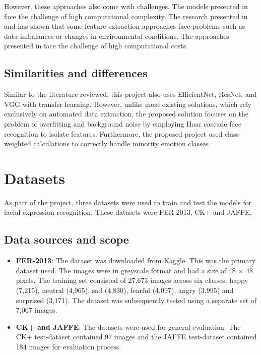 However, these approaches also come with challenges. The models presented in \citep{Dong2021} face the challenge of high computational complexity. The research presented in \citep{Agung2024} and \citep{Gautam2023} has shown that some feature extraction approaches face problems such as data imbalances or changes in environmental conditions. The approaches presented in \citep{Singh2023} face the challenge of high computational costs.
\newline

\section{Similarities and differences}
Similar to the literature reviewed, this project also uses EfficientNet, ResNet, and VGG with transfer learning. However, unlike most existing solutions, which rely exclusively on automated data extraction, the proposed solution focuses on the problem of overfitting and background noise by employing Haar cascade face recognition to isolate features. Furthermore, the proposed project used class-weighted calculations to correctly handle minority emotion classes.                                                                       
\newline

\chapter{Datasets}
	
As part of the project, three datasets were used to train and test the models for facial expression recognition. These datasets were FER-2013, CK+ and JAFFE.
\newline

\section{Data sources and scope}

\begin{itemize}
	\item \textbf{FER-2013}: The dataset was downloaded from Kaggle. This was the primary dataset used. The images were in greyscale format and had a size of 48 × 48 pixels. The training set consisted of 27,673 images across six classes: happy (7,215), neutral (4,965), sad (4,830), fearful (4,097), angry (3,995) and surprised (3,171). The dataset was subsequently tested using a separate set of 7,067 images.
	\item \textbf{CK+ and JAFFE}: The datasets were used for general evaluation. The CK+ test-dataset contained 97 images and the JAFFE test-dataset contained 184 images for evaluation process.
\end{itemize}

